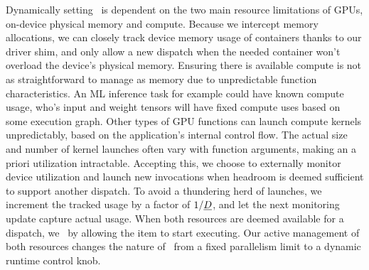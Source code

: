 Dynamically setting \D~is dependent on the two main resource limitations of GPUs, on-device physical memory and compute.
Because we intercept memory allocations, we can closely track device memory usage of containers thanks to our driver shim, and only allow a new dispatch when the needed container won't overload the device's physical memory.
Ensuring there is available compute is not as straightforward to manage as memory due to unpredictable function characteristics.
An ML inference task for example could have known compute usage, who's input and weight tensors will have fixed compute uses based on some execution graph.
Other types of GPU functions can launch compute kernels unpredictably, based on the application's internal control flow.
The actual size and number of kernel launches often vary with function arguments, making an a priori utilization intractable.
Accepting this, we choose to externally monitor device utilization and launch new invocations when headroom is deemed sufficient to support another dispatch.
To avoid a thundering herd of launches, we increment the tracked usage by a factor of $1/\emph{D}$, and let the next monitoring update capture actual usage.
When both resources are deemed available for a dispatch, we  \D~by allowing the item to start executing.
Our active management of both resources changes the nature of \D~from a fixed parallelism limit to a dynamic runtime control knob.

